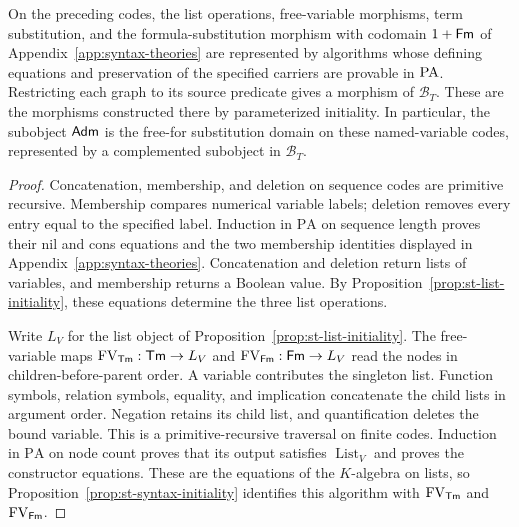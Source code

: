 \begin{proposition}
\label{prop:st-substitution-realization}
On the preceding codes, the list operations, free-variable morphisms,
term substitution, and the formula-substitution morphism with codomain
$1+\mathsf{Fm}$ of Appendix~\ref{app:syntax-theories} are represented by algorithms whose
defining equations and preservation of the specified carriers are
provable in $\mathrm{PA}$. Restricting each graph to its source predicate
gives a morphism of $\mathcal B_T$. These are the morphisms
constructed there by parameterized initiality. In particular, the
subobject $\mathsf{Adm}$ is the free-for substitution domain on
these named-variable codes, represented by a complemented
subobject in $\mathcal B_T$.
\end{proposition}
\begin{proof}
Concatenation, membership, and deletion on sequence codes are
primitive recursive. Membership compares numerical variable labels;
deletion removes every entry equal to the specified label.
Induction in $\mathrm{PA}$ on sequence length proves their nil and
cons equations and the two membership identities displayed in
Appendix~\ref{app:syntax-theories}. Concatenation and deletion return
lists of variables, and membership returns a Boolean value.
By Proposition~\ref{prop:st-list-initiality}, these equations determine
the three list operations.

Write $L_V$ for the list object of Proposition~\ref{prop:st-list-initiality}.
The free-variable maps $\operatorname{FV}_{\mathsf{Tm}}:\mathsf{Tm}\to L_V$ and
$\operatorname{FV}_{\mathsf{Fm}}:\mathsf{Fm}\to L_V$ read the nodes in children-before-parent order. A variable contributes
the singleton list. Function symbols, relation symbols, equality, and
implication concatenate the child lists in argument order. Negation
retains its child list, and quantification deletes the bound variable. This is a primitive-recursive traversal
on finite codes. Induction in $\mathrm{PA}$ on node count proves
that its output satisfies $\operatorname{List}_V$ and proves the
constructor equations. These are the equations of the
$K$-algebra on lists, so
Proposition~\ref{prop:st-syntax-initiality} identifies this algorithm
with $\operatorname{FV}_{\mathsf{Tm}}$ and $\operatorname{FV}_{\mathsf{Fm}}$.


\end{proof}
